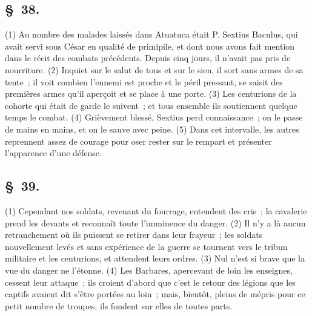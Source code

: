 \documentclass[french,twoside]{book} %
\begin{document}
\subsection[{§ 38.}]{ \textsc{§ 38.} }
\noindent (1) Au nombre des malades laissés dans Atuatuca était P. Sextius Baculus, qui avait servi sous César en qualité de primipile, et dont nous avons fait mention dans le récit des combats précédents. Depuis cinq jours, il n’avait pas pris de nourriture. (2) Inquiet sur le salut de tous et sur le sien, il sort sans armes de sa tente ; il voit combien l’ennemi est proche et le péril pressant, se saisit des premières armes qu’il aperçoit et se place à une porte. (3) Les centurions de la cohorte qui était de garde le suivent ; et tous ensemble ils soutiennent quelque temps le combat. (4) Grièvement blessé, Sextius perd connaissance ; on le passe de mains en mains, et on le sauve avec peine. (5) Dans cet intervalle, les autres reprennent assez de courage pour oser rester sur le rempart et présenter l’apparence d’une défense.
\subsection[{§ 39.}]{ \textsc{§ 39.} }
\noindent (1) Cependant nos soldats, revenant du fourrage, entendent des cris ; la cavalerie prend les devants et reconnaît toute l’imminence du danger. (2) Il n’y a là aucun retranchement où ils puissent se retirer dans leur frayeur ; les soldats nouvellement levés et sans expérience de la guerre se tournent vers le tribun militaire et les centurions, et attendent leurs ordres. (3) Nul n’est si brave que la vue du danger ne l’étonne. (4) Les Barbares, apercevant de loin les enseignes, cessent leur attaque ; ils croient d’abord que c’est le retour des légions que les captifs avaient dit s’être portées au loin ; mais, bientôt, pleins de mépris pour ce petit nombre de troupes, ils fondent sur elles de toutes parts.
\end{document}
